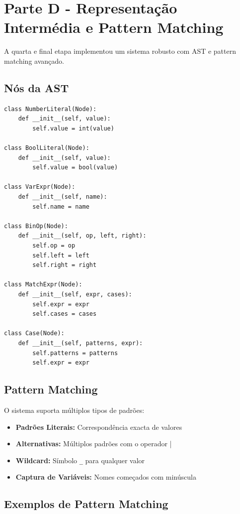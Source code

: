 \documentclass[11pt,a4paper]{report}
\begin{document}
\section{Parte D - Representação Intermédia e Pattern Matching}

A quarta e final etapa implementou um sistema robusto com AST e pattern matching avançado.

\subsection{Nós da AST}

\begin{lstlisting}
class NumberLiteral(Node):
    def __init__(self, value):
        self.value = int(value)

class BoolLiteral(Node):
    def __init__(self, value):
        self.value = bool(value)

class VarExpr(Node):
    def __init__(self, name):
        self.name = name

class BinOp(Node):
    def __init__(self, op, left, right):
        self.op = op
        self.left = left
        self.right = right

class MatchExpr(Node):
    def __init__(self, expr, cases):
        self.expr = expr
        self.cases = cases

class Case(Node):
    def __init__(self, patterns, expr):
        self.patterns = patterns
        self.expr = expr
\end{lstlisting}
\vspace{70}
\subsection{Pattern Matching}

O sistema suporta múltiplos tipos de padrões:

\begin{itemize}
    \item \textbf{Padrões Literais:} Correspondência exacta de valores
    \item \textbf{Alternativas:} Múltiplos padrões com o operador |
    \item \textbf{Wildcard:} Símbolo \texttt{\_} para qualquer valor
    \item \textbf{Captura de Variáveis:} Nomes começados com minúscula
\end{itemize}

\subsection{Exemplos de Pattern Matching}
\end{document}
